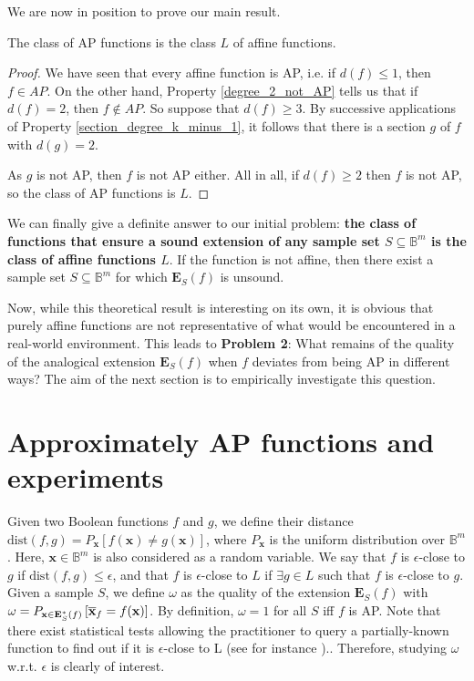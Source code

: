 We are now in position to prove our main result.

\begin{proposition}\label{AP_is_L}
The class of AP functions is the class $L$ of affine functions.
\end{proposition}
\begin{proof}
We have seen that every affine function is AP, i.e. if $d(f)\leq 1$, then $f\in
  AP$. On the other hand, Property \ref{degree_2_not_AP} tells us that if
  $d(f)=2$, then $f \notin AP$. So suppose that  $d(f)\geq 3$. By successive
  applications of Property \ref{section_degree_k_minus_1}, it follows that
  there is a section $g$ of $f$ with $d(g)=2$.

  As $g$ is not AP, then $f$ is not AP either. All in all, if $d(f) \geq 2$
  then $f$ is not AP, so the class of AP functions is $L$.
\end{proof}

We can finally give a definite answer to our initial problem: {\bf the class of
functions that ensure a sound extension of any sample set $S \subseteq
\mathbb{B}^m$ is the class of affine functions $L$}. If the function is not
affine, then there exist a sample set $S \subseteq \mathbb{B}^m$ for which
$\mathbf{E}_S(f)$ is unsound.

Now, while this theoretical result is interesting on its own, it is obvious
that purely affine functions are not representative of what would be
encountered in a real-world environment.  This leads to {\bf Problem 2}: What
remains of the quality of the analogical extension $\mathbf{E}_S(f)$ when $f$
deviates from being AP in different ways?  The aim of the next section is to
empirically investigate this question.

\section{Approximately AP functions and experiments}
\label{approximate_ap_functions}

Given two Boolean functions $f$ and $g$, we define their distance
$\text{dist}(f, g) = P_\mathbf{x}\left[f(\mathbf{x}) \neq
g(\mathbf{x})\right]$, where $P_\mathbf{x}$ is the uniform distribution over
$\mathbb{B}^m$. Here, $\mathbf{x} \in \mathbb{B}^m$ is also considered as a
random variable. We say that $f$ is $\epsilon$-close to $g$ if $\text{dist}(f,
g) \leq \epsilon$, and that $f$ is $\epsilon$-close to $L$ if $\exists g \in L$
such that $f$ is $\epsilon$-close to $g$. Given a sample $S$, we define
$\omega$ as the quality of the extension $\mathbf{E}_S(f)$ with $\omega =
P_{\mathbf{x}\in \mathbf{E}^*_S(f)}\left[\overline{\mathbf{x}}_f =
f(\mathbf{x})\right]$. By definition, $\omega=1$ for all $S$ iff $f$ is AP.
Note that there exist statistical tests allowing the practitioner to query a
partially-known function to find out if it is $\epsilon$-close to L (see for
instance \cite{BluLubRub1993}).. Therefore, studying $\omega$ w.r.t. $\epsilon$
is clearly of interest.

